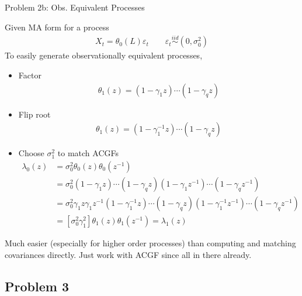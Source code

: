 \documentclass[handout]{beamer}
\newcommand{\iid}{\overset{iid}{\sim}}
\begin{document}
\begin{frame}[shrink]{Problem 2b: Obs. Equivalent Processes}

Given MA form for a process
\begin{align*}
  X_t = \theta_0(L)\varepsilon_t
  \qquad
  \varepsilon_t
  \iid
  (0,\sigma^2_0)
\end{align*}
To easily generate observationally equivalent processes,
\begin{itemize}
  \item Factor
    \begin{align*}
      \theta_1(z) = (1-\gamma_1 z)\cdots(1-\gamma_q z)
    \end{align*}
  \item
    Flip root
    \begin{align*}
      \theta_1(z) = (1-\gamma_1^{-1} z)\cdots(1-\gamma_q z)
    \end{align*}
  \item
    Choose $\sigma_1^2$ to match ACGFs
    \begin{align*}
      \lambda_0(z)
      &= \sigma^2_0\theta_0(z)\theta_0(z^{-1})
      \\
      &=
      \sigma^2_0
      (1-\gamma_1 z)\cdots(1-\gamma_q z)
      (1-\gamma_1 z^{-1})\cdots(1-\gamma_q z^{-1})
      \\
      &=
      \sigma^2_0
      \gamma_1 z \gamma_1z^{-1}
      (1-\gamma_1^{-1} z)\cdots(1-\gamma_q z)
      (1-\gamma_1^{-1} z^{-1})\cdots(1-\gamma_q z^{-1})
      \\
      &=
      [\sigma^2_0 \gamma_1^2]
      \theta_1(z)\theta_1(z^{-1})
      =
      \lambda_1(z)
    \end{align*}
\end{itemize}
Much easier (especially for higher order processes)
than computing and matching covariances directly.
Just work with ACGF since all in there already.
\end{frame}



\subsection{Problem 3}
\end{document}
